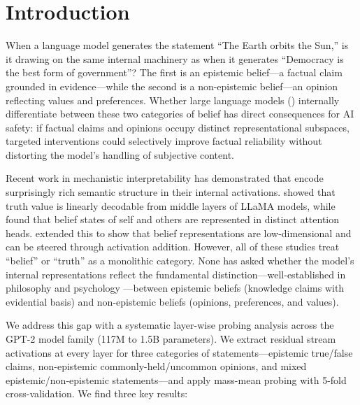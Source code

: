 \section{Introduction}
\label{sec:introduction}

When a language model generates the statement ``The Earth orbits the Sun,'' is it drawing on the same internal machinery as when it generates ``Democracy is the best form of government''? The first is an epistemic belief---a factual claim grounded in evidence---while the second is a non-epistemic belief---an opinion reflecting values and preferences. Whether large language models (\llms) internally differentiate between these two categories of belief has direct consequences for AI safety: if factual claims and opinions occupy distinct representational subspaces, targeted interventions could selectively improve factual reliability without distorting the model's handling of subjective content.

Recent work in mechanistic interpretability has demonstrated that \llms encode surprisingly rich semantic structure in their internal activations. \citet{marks2023geometry} showed that truth value is linearly decodable from middle layers of LLaMA models, while \citet{zhu2024language} found that belief states of self and others are represented in distinct attention heads. \citet{bortoletto2024brittle} extended this to show that belief representations are low-dimensional and can be steered through activation addition. However, all of these studies treat ``belief'' or ``truth'' as a monolithic category. None has asked whether the model's internal representations reflect the fundamental distinction---well-established in philosophy and psychology \citep{vesga2025psychological}---between epistemic beliefs (knowledge claims with evidential basis) and non-epistemic beliefs (opinions, preferences, and values).

We address this gap with a systematic layer-wise probing analysis across the GPT-2 model family (117M to 1.5B parameters). We extract residual stream activations at every layer for three categories of statements---epistemic true/false claims, non-epistemic commonly-held/uncommon opinions, and mixed epistemic/non-epistemic statements---and apply mass-mean probing \citep{marks2023geometry} with 5-fold cross-validation. We find three key results:

